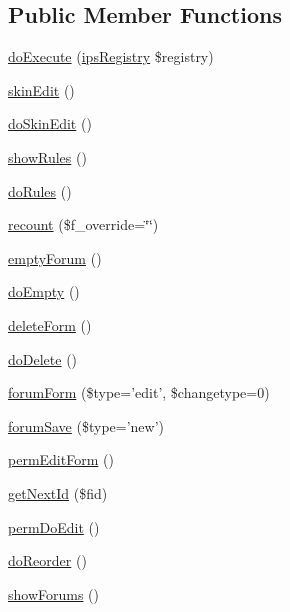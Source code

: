 \subsection*{Public Member Functions}
\begin{DoxyCompactItemize}
\item 
\hyperlink{classadmin__forums__forums__forums_afbc4e912a0604b94d47d66744c64d8ba}{do\-Execute} (\hyperlink{classips_registry}{ips\-Registry} \$registry)
\item 
\hyperlink{classadmin__forums__forums__forums_a262ae15afe59717f8d47f8ae480d7ad3}{skin\-Edit} ()
\item 
\hyperlink{classadmin__forums__forums__forums_afdb16cb4a86ed8c7c20e689d25e3476f}{do\-Skin\-Edit} ()
\item 
\hyperlink{classadmin__forums__forums__forums_a94482ba302310665293f273a3d833616}{show\-Rules} ()
\item 
\hyperlink{classadmin__forums__forums__forums_a5cfb8cdd5e91192cdac288d9442c1efb}{do\-Rules} ()
\item 
\hyperlink{classadmin__forums__forums__forums_a36a18b51ce928e6e386e27e0da2b9dd2}{recount} (\$f\-\_\-override=\char`\"{}\char`\"{})
\item 
\hyperlink{classadmin__forums__forums__forums_abf1084d36daf00f84f2b80c5413420a0}{empty\-Forum} ()
\item 
\hyperlink{classadmin__forums__forums__forums_afd632152c42bee13428129982c3fa9b6}{do\-Empty} ()
\item 
\hyperlink{classadmin__forums__forums__forums_aa3b41ed1db7da38d381bc5aa243052dd}{delete\-Form} ()
\item 
\hyperlink{classadmin__forums__forums__forums_a456f0999a393f02f9f18aecfbc6955aa}{do\-Delete} ()
\item 
\hyperlink{classadmin__forums__forums__forums_a8a1e8709bd6f7350550fb081b10fa35b}{forum\-Form} (\$type='edit', \$changetype=0)
\item 
\hyperlink{classadmin__forums__forums__forums_a6b282993ce71b0777583342ed507bcba}{forum\-Save} (\$type='new')
\item 
\hyperlink{classadmin__forums__forums__forums_a348be0ce0ca32eabba8e6e28d25c4158}{perm\-Edit\-Form} ()
\item 
\hyperlink{classadmin__forums__forums__forums_a96fa1efd9e4a421131f54e994a82516d}{get\-Next\-Id} (\$fid)
\item 
\hyperlink{classadmin__forums__forums__forums_a449a71348781af21294bc02711db8e39}{perm\-Do\-Edit} ()
\item 
\hyperlink{classadmin__forums__forums__forums_a03df2d26b9adb63d025c0415d7c9a1fc}{do\-Reorder} ()
\item 
\hyperlink{classadmin__forums__forums__forums_a5c931b8fd38846df62111d549604df53}{show\-Forums} ()
\end{DoxyCompactItemize}
